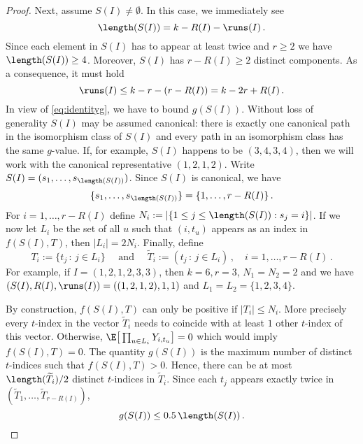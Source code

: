 \begin{proof}
Next, assume $S(I)\neq \emptyset$. In this case, we immediately see
\begin{equation}\label{eq:lengthsi}
\length(S(I))=k-R(I)-\runs(I)\,.
\end{equation}
Since each element in $S(I)$ has to appear at least twice and $r\ge 2$ we have $\length(S(I))\ge 4$. Moreover, $S(I)$ has $r-R(I)\ge 2$ distinct components.  
As a consequence, it must hold
\begin{equation}\label{eq:boundri}
\runs(I) \le k-r- (r-R(I)) =k-2r+R(I)\,.
\end{equation}
In view of \eqref{eq:identityg}, we have to bound $g(S(I))$. 
Without loss of generality $S(I)$ may be assumed canonical: there is exactly 
one canonical path in the isomorphism class of $S(I)$ and every path in an isomorphism class has the same $g$-value.
If, for example, $S(I)$ happens to be $(3,4,3,4)$, then we will work with the canonical representative $(1,2,1,2)$.
Write $S(I)= (s_1, \ldots, s_{\length(S(I))})$. Since $S(I)$ is canonical, we have
\begin{equation*}
\{s_1, \ldots, s_{\length(S(I))}\} = \{1,\ldots,r-R(I)\}\,.
\end{equation*}
For $ i=1,\ldots,r-R(I)$ define $N_i:= |\{1\le j\le \length(S(I)) : s_j=i\}|$. If we now let $L_i$ be the set of all $u$ such that $(i,t_u)$ appears as an index in $f(S(I),T)$, then $|L_i|=2 N_i$. Finally, define
\begin{equation*}
T_i:= \{t_j\,:\, j\in L_i \} \quad \text{ and } \quad \widetilde{T}_i:= (t_j\,:\, j\in L_i )\,, \quad i=1,\ldots,r-R(I)\,.
\end{equation*}
For example, if $I=(1,2,1,2,3,3)$, then $k=6,r=3$, $N_1=N_2=2$ and we have 
$(S(I),R(I),\runs(I))=((1,2,1,2),1,1)$ and $L_1=L_2=\{1,2,3,4\}$.
\par
By construction, $f(S(I),T)$ can only be positive if $|T_i| \le N_i$. More precisely every $t$-index in the vector $\widetilde{T}_i$ needs to coincide with at least $1$ other $t$-index of this vector. Otherwise,
$\E\big[\prod_{u\in L_i} Y_{i,t_u} \big]=0$
which would imply $f(S(I),T)=0$. The quantity $g(S(I))$ is the maximum number of distinct $t$-indices such that $f(S(I),T)>0$. Hence, there can be at most $\length(\widetilde{T}_i)/2$ distinct $t$-indices in $\widetilde{T}_i$. Since each $t_j$ appears exactly twice in $(\widetilde{T}_1, \ldots, \widetilde{T}_{r-R(I)})$, 
\begin{equation}\label{eq:gsings}
g(S(I))\le 0.5\,\length(S(I))\,.
\end{equation}

\end{proof}
